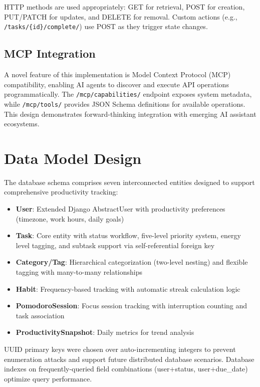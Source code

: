 \documentclass[11pt,a4paper]{article}
\begin{document}
HTTP methods are used appropriately: GET for retrieval, POST for creation, PUT/PATCH for updates, and DELETE for removal. Custom actions (e.g., \texttt{/tasks/\{id\}/complete/}) use POST as they trigger state changes.

\subsection{MCP Integration}

A novel feature of this implementation is Model Context Protocol (MCP) compatibility, enabling AI agents to discover and execute API operations programmatically. The \texttt{/mcp/capabilities/} endpoint exposes system metadata, while \texttt{/mcp/tools/} provides JSON Schema definitions for available operations. This design demonstrates forward-thinking integration with emerging AI assistant ecosystems.

\section{Data Model Design}

The database schema comprises seven interconnected entities designed to support comprehensive productivity tracking:

\begin{itemize}[noitemsep]
    \item \textbf{User}: Extended Django AbstractUser with productivity preferences (timezone, work hours, daily goals)
    \item \textbf{Task}: Core entity with status workflow, five-level priority system, energy level tagging, and subtask support via self-referential foreign key
    \item \textbf{Category/Tag}: Hierarchical categorization (two-level nesting) and flexible tagging with many-to-many relationships
    \item \textbf{Habit}: Frequency-based tracking with automatic streak calculation logic
    \item \textbf{PomodoroSession}: Focus session tracking with interruption counting and task association
    \item \textbf{ProductivitySnapshot}: Daily metrics for trend analysis
\end{itemize}

UUID primary keys were chosen over auto-incrementing integers to prevent enumeration attacks and support future distributed database scenarios. Database indexes on frequently-queried field combinations (user+status, user+due\_date) optimize query performance.
\end{document}
